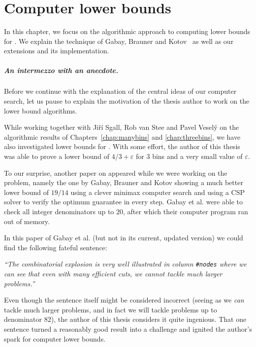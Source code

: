 \openright
\chapter{Computer lower bounds}\label{chap:lb}


In this chapter, we focus on the algorithmic approach to computing
lower bounds for \binstretch. We explain the technique of Gabay,
Brauner and Kotov~\cite{gabay2013lbv2} as well as our extensions and
its implementation.

\paragraph{An intermezzo with an anecdote.} Before we continue with
the explanation of the central ideas of our computer search, let us
pause to explain the motivation of the thesis author to work on the
lower bound algorithms.

While working together with Jiří Sgall, Rob van Stee and Pavel Veselý
on the algorithmic results of Chapters~\ref{chap:manybins} and
\ref{chap:threebins}, we have also investigated lower bounds for
\binstretch. With some effort, the author of this thesis was able to
prove a lower bound of $4/3 + \varepsilon$ for $3$ bins and a very
small value of $\varepsilon$.

To our surprise, another paper on \binstretch appeared while we were
working on the problem, namely the one by Gabay, Brauner and Kotov
\cite{gabay2013lbv2} showing a much better lower bound of $19/14$
using a clever minimax computer search and using a CSP solver to
verify the optimum guarantee in every step. Gabay et al. were able to
check all integer denominators up to $20$, after which their computer
program ran out of memory.

In this paper of Gabay et al. (but not in its current,
updated version) we could find the following fateful sentence:

\textit{``The combinatorial explosion is very well illustrated in column
\texttt{\#nodes} where we can see that even with many efficient cuts,
we cannot tackle much larger problems.''} \cite{gabay2013lbv2}

Even though the sentence itself might be considered incorrect (seeing
as we \emph{can} tackle much larger problems, and in fact we will
tackle problems up to denominator $82$), the author of this thesis
considers it quite ingenious. That one sentence turned a reasonably
good result into a challenge and ignited the author's spark for
computer lower bounds.
